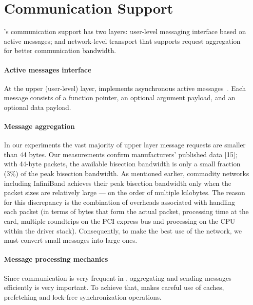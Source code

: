 \section{Communication Support}
\label{sec:communication}

\Grappa's communication support has two layers: user-level messaging interface
based on active messages; and network-level transport that supports request
aggregation for better communication bandwidth.


\paragraph{Active messages interface} At the upper (user-level) layer, \Grappa
implements asynchronous active messages~\cite{vonEicken92}. Each message
consists of a function pointer, an optional argument payload, and an optional
data payload. 


\paragraph{Message aggregation} In our experiments the vast majority of upper
layer message requests are smaller than 44 bytes. Our measurements confirm
manufacturers' published data [15]; with 44-byte packets, the available
bisection bandwidth is only a small fraction (3\%) of the peak bisection
bandwidth. As mentioned earlier, commodity networks including InfiniBand
achieves their peak bisection bandwidth only when the packet sizes are
relatively large --- on the order of multiple kilobytes. The reason for this
discrepancy is the combination of overheads associated with handling each
packet (in terms of bytes that form the actual packet, processing time at the
card, multiple roundtrips on the PCI express bus and processing on the CPU
within the driver stack). Consequently, to make the best use of the network,
we must convert small messages into large ones.

\paragraph{Message processing mechanics} Since communication is very frequent
in \Grappa, aggregating and sending messages efficiently is very important. To
achieve that, \Grappa makes careful use of caches, prefetching and lock-free
synchronization operations. 

